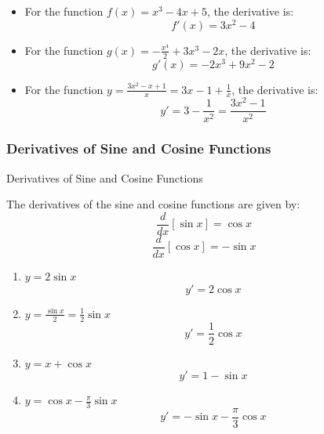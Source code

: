 \documentclass[12pt]{article}
\theoremstyle{beautifulthm}
\begin{document}
\begin{tcolorbox}[colback=examplebg, colframe=red!75!black, title=\textbf{EXAMPLE 4: Using the Sum and Difference Rules}, fonttitle=\bfseries, sharp corners]
\begin{itemize}
    \item[\textbf{a.}] For the function \( f(x) = x^3 - 4x + 5 \), the derivative is:
    \[
    f'(x) = 3x^2 - 4
    \]

    \item[\textbf{b.}] For the function \( g(x) = -\frac{x^4}{2} + 3x^3 - 2x \), the derivative is:
    \[
    g'(x) = -2x^3 + 9x^2 - 2
    \]

    \item[\textbf{c.}] For the function \( y = \frac{3x^2 - x + 1}{x} = 3x - 1 + \frac{1}{x} \), the derivative is:
    \[
    y' = 3 - \frac{1}{x^2} = \frac{3x^2 - 1}{x^2}
    \]
\end{itemize}

\end{tcolorbox}


\subsubsection{Derivatives of Sine and Cosine Functions}
\begin{mytheorem}{Derivatives of Sine and Cosine Functions}{}

The derivatives of the sine and cosine functions are given by:
\[
\frac{d}{dx}[\sin x] = \cos x
\]
\[
\frac{d}{dx}[\cos x] = -\sin x
\]
\end{mytheorem}


\begin{tcolorbox}[colback=examplebg, colframe=red!75!black, title=\textbf{EXAMPLE 5: Derivatives of Sine and Cosine Functions}, fonttitle=\bfseries, sharp corners]
\begin{enumerate}
    \item[a.] $y = 2 \sin x$
    \[
    y' = 2 \cos x
    \]
    \item[b.] $y = \frac{\sin x}{2} = \frac{1}{2} \sin x$
    \[
    y' = \frac{1}{2} \cos x
    \]
    \item[c.] $y = x + \cos x$
    \[
    y' = 1 - \sin x
    \]
    \item[d.] $y = \cos x - \frac{\pi}{3} \sin x$
    \[
    y' = -\sin x - \frac{\pi}{3} \cos x
    \]
\end{enumerate}

\end{tcolorbox}
\end{document}
